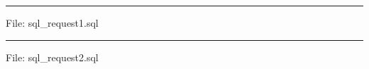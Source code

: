 \noindent
\rule{2cm}{0.5pt} File: sql\_request1.sql \hrulefill


\noindent
\rule{2cm}{0.5pt} File: sql\_request2.sql \hrulefill


